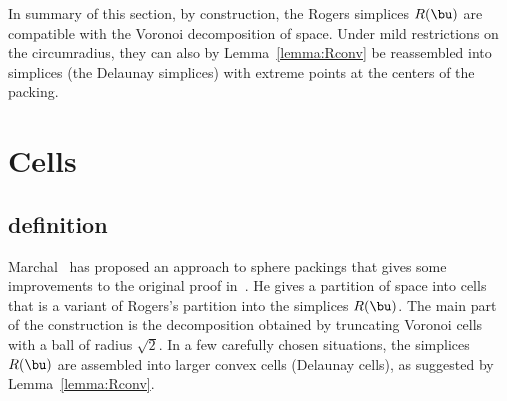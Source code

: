 \begin{cnl}
In summary of this section, by construction, the Rogers simplices
$R(\bu)$ are compatible with the Voronoi decomposition of space.
Under mild restrictions on the circumradius, they can also by
Lemma~\ref{lemma:Rconv} be reassembled into simplices (the Delaunay
simplices) with extreme points at the centers of the packing.

%
%


\section{Cells}\label{cells}


\subsection{definition}\label{cell-definition}

Marchal~\cite{marchal:2009} has proposed an approach to sphere
packings that gives some improvements to the original proof
in~\cite{Hales:2006:DCG}.  
He gives a partition of space into cells that is a variant of Rogers's partition into
the simplices $R(\bu)$.  The main part of the construction is the
decomposition obtained by truncating Voronoi cells with a ball of
radius $\sqrt2$.  In a few carefully chosen situations, the simplices
$R(\bu)$ are assembled into larger convex cells (Delaunay cells), as
suggested by Lemma~\ref{lemma:Rconv}.

%
%



\end{cnl}
